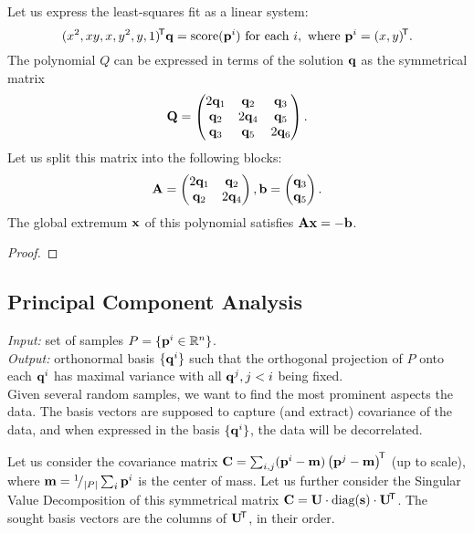 Let us express the least-squares fit as a linear system:
$$(x^2, xy, x, y^2, y, 1)^{\!\mathsf{T}} \mathbf{q} = \textrm{score}(\mathbf{p}^i) \text{ for each } i, \text{ where } \mathbf{p}^i = (x, y)^{\!\mathsf{T}}.$$
The polynomial $Q$ can be expressed in terms of the solution $\mathbf{q}$ as the symmetrical matrix
$$\mathbf{Q} = \begin{pmatrix}
 2 \mathbf{q}_1 & \mathbf{q}_2 & \mathbf{q}_3 \\
 \mathbf{q}_2 & 2 \mathbf{q}_4 & \mathbf{q}_5 \\
 \mathbf{q}_3 & \mathbf{q}_5 & 2 \mathbf{q}_6
\end{pmatrix}.$$
Let us split this matrix into the following blocks:
$$\mathbf{A} = \begin{pmatrix}
 2 \mathbf{q}_1 & \mathbf{q}_2 \\
 \mathbf{q}_2 & 2 \mathbf{q}_4 \\
\end{pmatrix},
\mathbf{b} = \begin{pmatrix}
 \mathbf{q}_3 \\
 \mathbf{q}_5 \\
\end{pmatrix}.$$
The global extremum $\mathbf{x}$ of this polynomial satisfies $\mathbf{A} \mathbf{x} = -\mathbf{b}$.

\begin{proof}
\todo{\dots}
\end{proof}

\subsection{Principal Component Analysis}
\textit{Input:} set of samples $P = \{\mathbf{p}^i \in \mathbb{R}^n \}$.\\
\textit{Output:} orthonormal basis $\{\mathbf{q}^i\}$ such that the orthogonal projection of $P$ onto each $\mathbf{q}^i$ has maximal variance with all $\mathbf{q}^j, j < i$ being fixed.\\

Given several random samples, we want to find the most prominent aspects the data.
The basis vectors are supposed to capture (and extract) covariance of the data, and when expressed in the basis $\{\mathbf{q}^i\}$, the data will be decorrelated.

Let us consider the covariance matrix $\mathbf{C} = \sum_{i,j} (\mathbf{p}^i - \mathbf{m}) \left(\mathbf{p}^j - \mathbf{m} \right) ^{\!\mathsf{T}}$ (up to scale), where $\mathbf{m} = {}^{1}\!/_{|P|} \sum_i \mathbf{p}^i$ is the center of mass. Let us further consider the Singular Value Decomposition of this symmetrical matrix $\mathbf{C} = \mathbf{U} \cdot \textrm{diag}(\mathbf{s}) \cdot \mathbf{U}^{\!\mathsf{T}}$.
The sought basis vectors are the columns of $\mathbf{U}^{\!\mathsf{T}}$, in their order.

